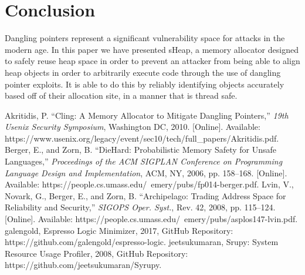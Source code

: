 \documentclass[conference]{IEEEtran}
\begin{document}
\section{Conclusion}
Dangling pointers represent a significant vulnerability space for attacks in the modern age. 
In this paper we have presented sHeap, a memory allocator designed to safely reuse heap space 
in order to prevent an attacker from being able to align heap objects in order to arbitrarily 
execute code through the use of dangling pointer exploits. It is able to do this by reliably 
identifying objects accurately based off of their allocation site, in a manner that is thread 
safe.

\begin{thebibliography}{00}
 Akritidis, P. ``Cling: A Memory Allocator to Mitigate Dangling Pointers,'' \textit{19th Usenix Security Symposium}, Washington DC, 2010. [Online]. Available: https://www.usenix.org/legacy/event/sec10/tech/full\_papers/Akritidis.pdf.
 Berger, E., and Zorn, B. ``DieHard: Probabilistic Memory Safety for Unsafe Languages,'' \textit{Proceedings of the ACM SIGPLAN Conference on Programming Language Design and Implementation}, ACM, NY, 2006, pp. 158--168. [Online]. Available: https://people.cs.umass.edu/~emery/pubs/fp014-berger.pdf.
 Lvin, V., Novark, G., Berger, E., and Zorn, B. ``Archipelago: Trading Address Space for Reliability and Security,'' \textit{SIGOPS Oper. Syst.}, Rev. 42, 2008, pp. 115--124. [Online]. Available: https://people.cs.umass.edu/~emery/pubs/asplos147-lvin.pdf.
 galengold, Espresso Logic Minimizer, 2017, GitHub Repository: https://github.com/galengold/espresso-logic.
 jeetsukumaran, Srupy: System Resource Usage Profiler, 2008, GitHub Repository: https://github.com/jeetsukumaran/Syrupy.
\end{thebibliography}
\end{document}
